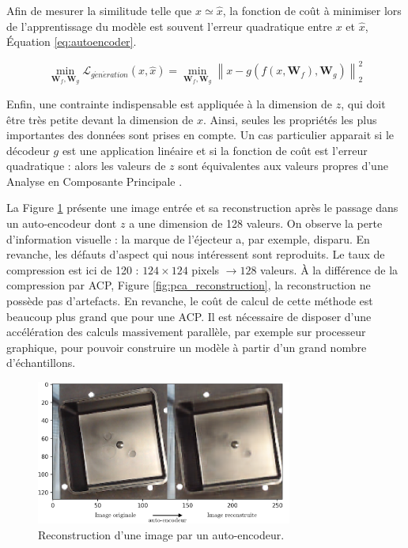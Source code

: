 Afin de mesurer la similitude telle que $x \simeq \hat x$, la fonction de coût à minimiser lors de l'apprentissage du modèle est souvent l'erreur quadratique entre $x$ et $\hat x$, Équation \ref{eq:autoencoder}.

\begin{equation} \label{eq:autoencoder}
\min _{\mathbf{W}_{f}, \mathbf{W}_{g}} \mathcal{L}_{g\acute{e}n\acute{e}ration}\left(x, \hat{x}\right) = \min _{\mathbf{W}_{f}, \mathbf{W}_{g}} \left\|x-g\left(f\left(x, \mathbf{W}_{f}\right), \mathbf{W}_{g}\right)\right\|_{2}^{2}
\end{equation}

Enfin, une contrainte indispensable est appliquée à la dimension de $z$, qui doit être très petite devant la dimension de $x$.
Ainsi, seules les propriétés les plus importantes des données sont prises en compte.
Un cas particulier apparait si le décodeur $g$ est une application linéaire et si la fonction de coût est l'erreur quadratique : alors les valeurs de $z$ sont équivalentes aux valeurs propres d'une Analyse en Composante Principale \cite{bourlard_autoassociation_1988}.

La Figure \ref{fig:autoencoder} présente une image entrée et sa reconstruction après le passage dans un auto-encodeur dont $z$ a une dimension de 128 valeurs.
On observe la perte d'information visuelle : la marque de l'éjecteur a, par exemple, disparu.
En revanche, les défauts d'aspect qui nous intéressent sont reproduits.
Le taux de compression est ici de 120 : $124 \times 124$ pixels $\rightarrow 128$ valeurs.
À la différence de la compression par ACP, Figure \ref{fig:pca_reconstruction}, la reconstruction ne possède pas d'artefacts.
En revanche, le coût de calcul de cette méthode est beaucoup plus grand que pour une ACP.
Il est nécessaire de disposer d'une accélération des calculs massivement parallèle, par exemple sur processeur graphique, pour pouvoir construire un modèle à partir d'un grand nombre d'échantillons.

\begin{figure}[hbtp]
    \centering
    \includegraphics[width=0.75\textwidth,height=\textheight,keepaspectratio]{../Chap4/Figures/visualize_reconstructed_variations.png}
    \caption{Reconstruction d'une image par un auto-encodeur.}
    \label{fig:autoencoder}
\end{figure}

